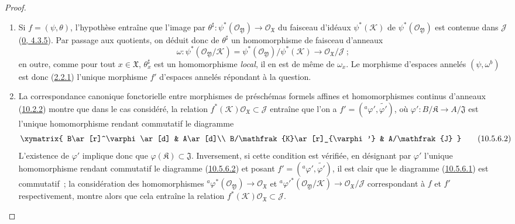 \begin{proof}
\medskip\noindent
\begin{enumerate}
  \item[\rm{(i)}] Si $f=(\psi,\theta)$, l'hypothèse entraîne que
    l'image par
    $\theta^\sharp:\psi^*(\mathscr{O}_{\mathfrak{Y}})\to
    \mathscr{O}_{\mathfrak{X}}$ du faisceau d'idéaux
    $\psi^*(\mathscr{K})$ de $\psi^*(\mathscr{O}_{\mathfrak{Y}})$ est
    contenue dans $\mathscr{J}$
    (\hyperref[0.4.3.5-fr]{0, 4.3.5}). Par passage aux quotients, on
    déduit donc de $\theta^\sharp$ un homomorphisme de faisceau d'anneaux
    \[
      \omega:\psi^*(\mathscr{O}_{\mathfrak{Y}}/\mathscr{K})
      =\psi^*(\mathscr{O}_{\mathfrak{Y}})/\psi^*(\mathscr{K})
      \to\mathscr{O}_{\mathfrak{X}}/\mathscr{J}~;
    \]
    en outre, comme pour tout $x\in\mathfrak{X}$,
    $\theta_x^\sharp$ est un homomorphisme \emph{local}, il en est de
    même de $\omega_x$. Le morphisme d'espaces annelés
    $(\psi,\omega^b)$ est donc
    (\hyperref[I.2.2.1-fr]{2.2.1}) l'unique morphisme $f'$ d'espaces
    annelés répondant à la question.
  \item[\rm{(ii)}] La correspondance canonique fonctorielle entre
    morphismes de préschémas formels affines et homomorphismes continus
    d'anneaux (\hyperref[I.10.2.2-fr]{10.2.2}) montre que dans le cas
    considéré, la relation
    $f^*(\mathscr{K})\mathscr{O}_{\mathfrak{X}}\subset\mathscr{J}$
    entraîne que l'on a
    $f'=({}^a\varphi',\widetilde{\varphi'})$, où
    $\varphi':B/\mathfrak{K}\to A/\mathfrak{J}$ est l'unique
    homomorphisme rendant commutatif le diagramme
    \[
      \label{I.10.5.6.2-fr}
      \xymatrix{
        B\ar[r]^\varphi\ar[d] & A\ar[d]\\
        B/\mathfrak{K}\ar[r]_{\varphi'} & A/\mathfrak{J}
      }
      \tag{10.5.6.2}
    \]
    L'existence de $\varphi'$ implique donc que
    $\varphi(\mathfrak{K})\subset\mathfrak{J}$. Inversement, si cette
    condition est vérifiée, en désignant par $\varphi'$ l'unique
    homomorphisme rendant commutatif le diagramme
    (\hyperref[I.10.5.6.2-fr]{10.5.6.2}) et posant
    $f'=({}^a\varphi',\widetilde{\varphi'})$, il est clair que le
    diagramme (\hyperref[I.10.5.6.1-fr]{10.5.6.1}) est commutatif~; la
    considération des homomorphismes
    ${}^a\varphi^*(\mathscr{O}_{\mathfrak{Y}})\to
    \mathscr{O}_{\mathfrak{X}}$ et
    ${}^a{\varphi'}^*(\mathscr{O}_{\mathfrak{Y}}/\mathscr{K})\to
    \mathscr{O}_{\mathfrak{X}}/\mathscr{J}$ correspondant à $f$ et
    $f'$ respectivement, montre alors que cela entraîne la relation
    $f^*(\mathscr{K})\mathscr{O}_{\mathfrak{X}}\subset\mathscr{J}$.
\end{enumerate}
\end{proof}

